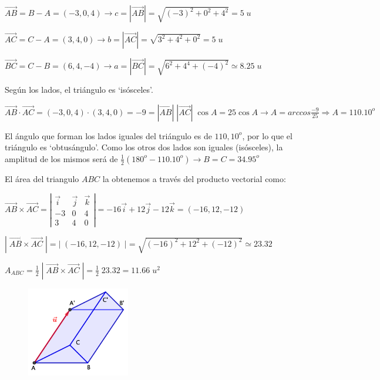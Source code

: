 \begin{proofw}\renewcommand{\qedsymbol}{$\diamond$}
	$\overrightarrow {AB}=B-A=(-3,0,4) \to c=|\overrightarrow {AB}|=\sqrt{(-3)^2+0^2+4^2}=5\; u$
	
\noindent $\overrightarrow {AC}=C-A=(3,4,0) \to b=|\overrightarrow {AC}|=\sqrt{3^2+4^2+0^2}=5\; u$

\noindent $\overrightarrow {BC}=C-B=(6,4,-4) \to a=|\overrightarrow {BC}|=\sqrt{6^2+4^4+(-4)^2}\simeq 8.25\; u$

Según los lados, el triángulo es `isósceles'.

\noindent $\overrightarrow {AB} \cdot \overrightarrow {AC}=(-3,0,4) \cdot  (3,4,0)= -9=|\overrightarrow {AB}|\;|\overrightarrow {AC}|\; \cos A=25\cos A \to A=arc cos \frac {-9}{25} \Rightarrow A=110.10^o$

El ángulo que forman los lados iguales del triángulo es de $110,10^o$, por lo que el triángulo es `obtusángulo'. Como los otros dos lados son iguales (isósceles), la amplitud de los mismos será de $\frac 1 2 (180^o -110.10^o) \to B=C=34.95^o$

El área del triangulo $ABC$ la obtenemos a través del producto vectorial como:

\noindent $\overrightarrow {AB}\times \overrightarrow {AC}= 
\left| \begin{matrix} \vec i&\vec j&\vec k \\-3&0&4\\3&4&0\end{matrix} \right|=-16\vec i+12 \vec j- 12 \vec k=(-16,12,-12)$

\noindent $|\; \overrightarrow {AB}\times \overrightarrow {AC}\; |=|\; (-16,12,-12)\;| = \sqrt{(-16)^2+12^2+(-12)^2}\simeq 23.32$

\noindent $A_{ABC}=\frac 1 2 \; |\; \overrightarrow {AB}\times \overrightarrow {AC}\; |=\frac 1 2 \; 23.32=11.66 \; u^2$

\begin{multicols}{2}
\begin{figure}[H]
	\centering
	\includegraphics[width=0.4\textwidth]{imagenes/imagenes09/T09IM28.png}
	\end{figure}


\end{multicols}
\end{proofw}

